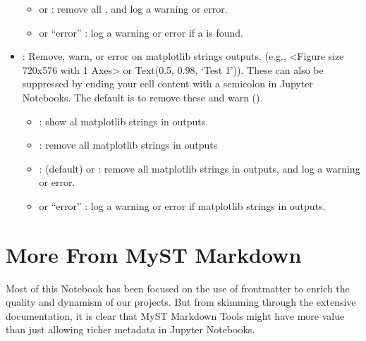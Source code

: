 \documentclass[letterpaper,12pt,english]{sphinxmanual}
\begin{document}
\begin{itemize}
\begin{itemize}
\item {} 
\sphinxAtStartPar
{} or  : remove all , and log a warning or error.

\item {} 
\sphinxAtStartPar
{} or “error” : log a warning or error if a  is found.

\end{itemize}

\item {} 
\sphinxAtStartPar
{} : Remove, warn, or error on matplotlib strings outputs. (e.g., \textless{}Figure size 720x576 with 1 Axes\textgreater{} or Text(0.5, 0.98, ‘Test 1’)). These can also be suppressed by ending your cell content with a semicolon in Jupyter Notebooks. The default is to remove these and warn ().
\begin{itemize}
\item {} 
\sphinxAtStartPar
{} : show al matplotlib strings in outputs.

\item {} 
\sphinxAtStartPar
{} : remove all matplotlib strings in outputs

\item {} 
\sphinxAtStartPar
{} : (default) or  : remove all matplotlib strings in outputs, and log a warning or error.

\item {} 
\sphinxAtStartPar
{} or “error” : log a warning or error if matplotlib strings in outputs.

\end{itemize}

\end{itemize}


\chapter{More From MyST Markdown}
\label{\detokenize{notebooks/02-myst.integration:more-from-myst-markdown}}
\sphinxAtStartPar
Most of this Notebook has been focused on the use of frontmatter to enrich the quality and dynamism of our projects. But from skimming through the extensive documentation, it is clear that MyST Markdown Tools might have more value than just allowing richer metadata in Jupyter Notebooks.
\end{document}

